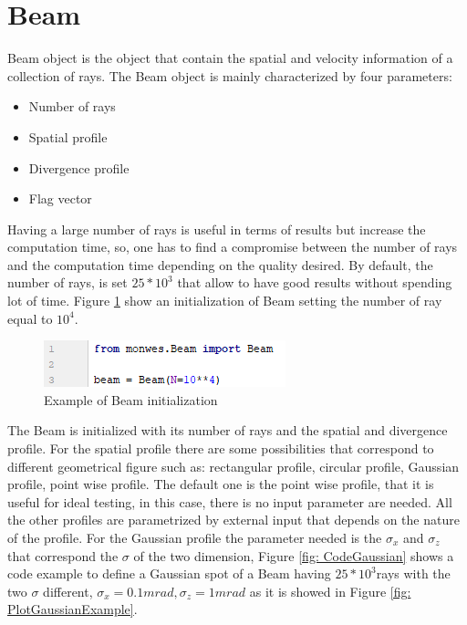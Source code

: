 \section{Beam}
Beam object is the object that contain the spatial and velocity information of a collection of rays. The Beam object is mainly characterized by four parameters: 
\begin{itemize}
\item Number of rays
\item Spatial profile
\item Divergence profile
\item Flag vector
\end{itemize}
Having a large number of rays is useful in terms of results but increase the computation time, so, one has to find a compromise between the number of rays and the computation time depending on the quality desired. By default, the number of rays, is set $25*10^3 $ that allow to have good results without spending lot of time. Figure \ref{fig: BeamRays} show an initialization of Beam setting the number of ray equal to $10^4 $.
\begin{figure}[H]
%
\centering
%
\includegraphics[width=.4\textwidth]{Immagini/Chapter3/BeamRays}
%
\caption{Example of Beam initialization}
%
\label{fig: BeamRays}
%
\end{figure}
The Beam is initialized with its number of rays and the spatial and divergence profile. For the spatial profile there are some possibilities that correspond to different geometrical figure such as: rectangular profile, circular profile, Gaussian profile, point wise profile. The default one is the point wise profile, that it is useful for ideal testing, in this case, there is no input parameter are needed. All the other profiles are parametrized by external input that depends on the nature of the profile. For the Gaussian profile the parameter needed is the $\sigma_x $ and $\sigma_z $ that correspond the $\sigma $ of the two dimension, Figure \ref{fig: CodeGaussian} shows a code example to define a Gaussian spot of a Beam having $25*10^3 $rays with the two $\sigma $ different, $\sigma_x = 0.1mrad, \sigma_z = 1mrad $ as it is showed in Figure \ref{fig: PlotGaussianExample}.
%
